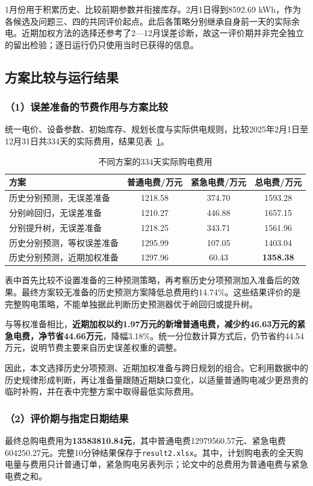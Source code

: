1月份用于积累历史、比较前期参数并衔接库存。2月1日得到8592.69 kWh，作为各候选及问题三、四的共同评价起点。此后各策略分别继承自身前一天的实际余电。近期加权方法的选择还参考了2—12月误差诊断，故这一评价期并非完全独立的留出检验；逐日运行仍只使用当时已获得的信息。

\subsection{方案比较与运行结果}
\subsubsection*{（1）误差准备的节费作用与方案比较}
统一电价、设备参数、初始库存、规划长度与实际供电规则，比较2025年2月1日至12月31日共334天的实际费用，结果见表~\ref{tab:q2_model_compare}。
\begin{table}[!htbp]
\centering
\caption{不同方案的334天实际购电费用}
\label{tab:q2_model_compare}
\begin{tabular}{lccc}
\hline
方案 & 普通电费/万元 & 紧急电费/万元 & 总电费/万元 \\
\hline
历史分别预测，无误差准备
& 1218.58 & 374.70 & 1593.28 \\
分别岭回归，无误差准备
& 1210.27 & 446.88 & 1657.15 \\
分别提升树，无误差准备
& 1218.25 & 343.71 & 1561.96 \\
历史分别预测，等权误差准备
& 1295.99 & 107.05 & 1403.04 \\
历史分别预测，近期加权准备
& 1297.96 & 60.43 & \textbf{1358.38} \\
\hline
\end{tabular}
\end{table}
表中首先比较不设置准备的三种预测策略，再考察历史分项预测加入准备后的效果。最终方案较无准备的历史预测方案降低总费用约14.74\%。这些结果评价的是完整购电策略，不能单独据此判断历史预测器优于岭回归或提升树。

与等权准备相比，\textbf{近期加权以约1.97万元的新增普通电费，减少约46.63万元的紧急电费，净节省44.66万元}，降幅3.18\%。统一分位数计算方式后，仍节省约44.54万元，说明节费主要来自历史误差权重的调整。

因此，本文选择历史分项预测、近期加权准备与跨日规划的组合。它利用数据中的历史规律形成判断，再让准备量跟随近期缺口变化，以适量普通购电减少更昂贵的临时补购，并在表中完整方案中取得最低实际费用。

\subsubsection*{（2）评价期与指定日期结果}
最终总购电费用为\textbf{13583810.84元}，其中普通电费12979560.57元、紧急电费604250.27元。完整10分钟结果保存于\texttt{result2.xlsx}。其中，计划购电表的全天购电量与费用只计普通订单，紧急购电另表列示；论文中的总费用为普通电费与紧急电费之和。

